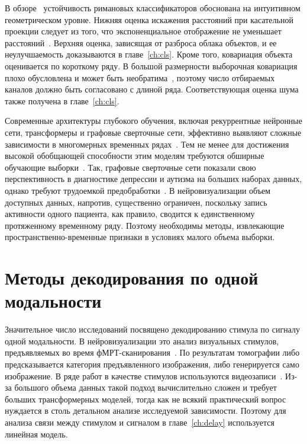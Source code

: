 В обзоре~\cite{congedo2017riemannian} устойчивость римановых классификаторов обоснована на интуитивном геометрическом уровне. Нижняя оценка искажения расстояний при касательной проекции следует из того, что экспоненциальное отображение не уменьшает расстояний~\cite{bhatia2003exponential}. Верхняя оценка, зависящая от разброса облака объектов, и ее неулучшаемость доказываются в главе~\ref{ch:cls}. Кроме того, ковариация объекта оценивается по короткому ряду. В большой размерности выборочная ковариация плохо обусловлена и может быть необратима~\cite{ledoit2004well}, поэтому число отбираемых каналов должно быть согласовано с длиной ряда. Соответствующая оценка шума также получена в главе~\ref{ch:cls}.

Современные архитектуры глубокого обучения, включая рекуррентные нейронные сети, трансформеры и графовые сверточные сети, эффективно выявляют сложные зависимости в многомерных временных рядах~\cite{hochreiter1997long, vaswani2017attention, dai2023classification}. Тем не менее для достижения высокой обобщающей способности этим моделям требуются обширные обучающие выборки~\cite{shao2022transformers, boulmaiz2020impact}. Так, графовые сверточные сети показали свою перспективность в диагностике депрессии и аутизма на больших наборах данных, однако требуют трудоемкой предобработки~\cite{dai2023classification, park2023residual}. В нейровизуализации объем доступных данных, напротив, существенно ограничен, поскольку запись активности одного пациента, как правило, сводится к единственному протяженному временному ряду. Поэтому необходимы методы, извлекающие пространственно-временные признаки в условиях малого объема выборки.

\section{Методы декодирования по одной модальности}\label{sec1:single}

Значительное число исследований посвящено декодированию стимула по сигналу одной модальности. В нейровизуализации это анализ визуальных стимулов, предъявляемых во время фМРТ-сканирования~\cite{haxby2001distributed, COX2003261, kamitani2005, haynes2005, THIRION20061104, ozcelik2023naturalscenereconstructionfmri}. По результатам томографии либо предсказывается категория предъявленного изображения, либо генерируется само изображение. В ряде работ в качестве стимулов используются видеозаписи~\cite{chen2023cinematicmindscapeshighqualityvideo, Lan2023SeeingTT}. Из-за большого объема данных такой подход вычислительно сложен и требует больших трансформерных моделей, тогда как не всякий практический вопрос нуждается в столь детальном анализе исследуемой зависимости. Поэтому для анализа связи между стимулом и сигналом в главе~\ref{ch:delay} используется линейная модель.

